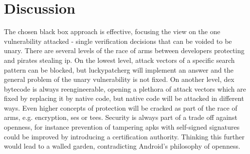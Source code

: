 \section{Discussion} \label{section:conclusion-discussion}
The chosen black box approach is effective, focusing the view on the one vulnerability attacked - single verification decisions that can be voided to be unary.
\newline
\newline
There are several levels of the race of arms between developers protecting and pirates stealing \gls{ip}.
\newline
On the lowest level, attack vectors of a specific search pattern can be blocked, but \gls{luckypatcherg} will implement an answer and the general problem of the unary vulnerability is not fixed.
\newline
On another level, dex bytecode is always reengineerable, opening a plethora of attack vectors which are fixed by replacing it by native code, but native code will be attacked in different ways.
\newline
Even higher concepts of protection will be cracked as part of the race of arms, e.g. encryption, \gls{se}s or \gls{tee}s.
\newline
\newline
Security is always part of a trade off against openness, for instance prevention of tampering \gls{apk}s with self-signed signatures could be improved by introducing a certification authority.
Thinking this further would lead to a walled garden, contradicting Android’s philosophy of openness.
